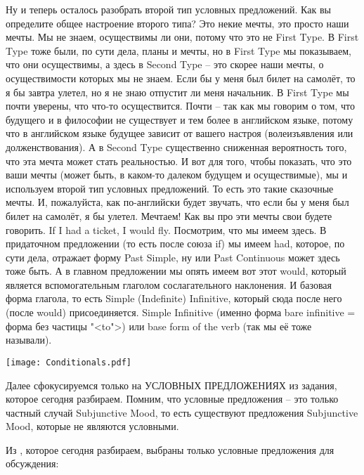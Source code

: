 \documentclass[main.tex]{subfiles}
\begin{document}
Ну и теперь осталось разобрать второй тип условных предложений.
Как вы определите общее настроение второго типа?
Это некие мечты, это просто наши мечты.
Мы не знаем, осуществимы ли они, потому что это не First Type.
В First Type тоже были, по сути дела, планы и мечты, но в First Type мы показываем, что они осуществимы, а здесь в Second Type -- это скорее наши мечты, о осуществимости которых мы не знаем.
Если бы у меня был билет на самолёт, то я бы завтра улетел, но я не знаю отпустит ли меня начальник.
В First Type мы почти уверены, что что-то осуществится.
Почти -- так как мы говорим о том, что будущего и в философии не существует и тем более в английском языке, потому что в английском языке будущее зависит от вашего настроя (волеизъявления или долженствования).
А в Second Type существенно сниженная вероятность того, что эта мечта может стать реальностью.
И вот для того, чтобы показать, что это ваши мечты (может быть, в каком-то далеком будущем и осуществимые), мы и используем второй тип условных предложений.
То есть это такие сказочные мечты.
И, пожалуйста, как по-английски будет звучать, что если бы у меня был билет на самолёт, я бы улетел.
Мечтаем!
Как вы про эти мечты свои будете говорить.
If I had a ticket, I would fly.
Посмотрим, что мы имеем здесь.
В придаточном предложении (то есть после союза if) мы имеем had, которое, по сути дела, отражает форму Past Simple, ну или Past Continuous может здесь тоже быть.
А в главном предложении мы опять имеем вот этот would, который является вспомогательным глаголом сослагательного наклонения.
И базовая форма глагола, то есть Simple (Indefinite) Infinitive, который сюда после него (после would) присоединяется.
Simple Infinitive (именно форма bare infinitive = форма без частицы "<to">) или base form of the verb (так мы её тоже называли).

{\parindent0pt\texttt{[image: Conditionals.pdf]}}

\newpage
{}

Далее сфокусируемся только на УСЛОВНЫХ ПРЕДЛОЖЕНИЯХ из задания, которое сегодня разбираем.
Помним, что условные предложения -- это только частный случай Subjunctive Mood, то есть существуют предложения Subjunctive Mood, которые не являются условными.

Из \hyperlink{ltask:2024-03-13}{\color{blue}{задания на Subjunctive Mood}}, которое сегодня разбираем, выбраны только условные предложения для обсуждения:
\\
\end{document}

